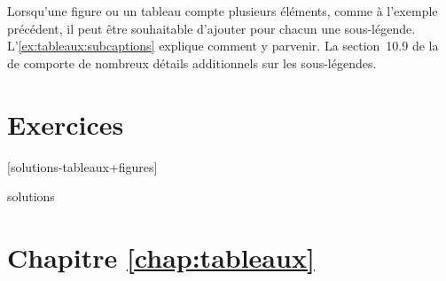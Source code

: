 Lorsqu'une figure ou un tableau compte plusieurs éléments, comme à
l'exemple précédent, il peut être souhaitable d'ajouter pour chacun
une sous-légende. L'\autoref{ex:tableaux:subcaptions} explique
comment y parvenir. La section~10.9 de la %
de  comporte de nombreux détails additionnels sur les
sous-légendes.



\section{Exercices}
\label{sec:tableaux:exercices}

[solutions-tableaux+figures]

\begin{Filesave}{solutions}
\section*{Chapitre \ref*{chap:tableaux}}

\end{Filesave}

